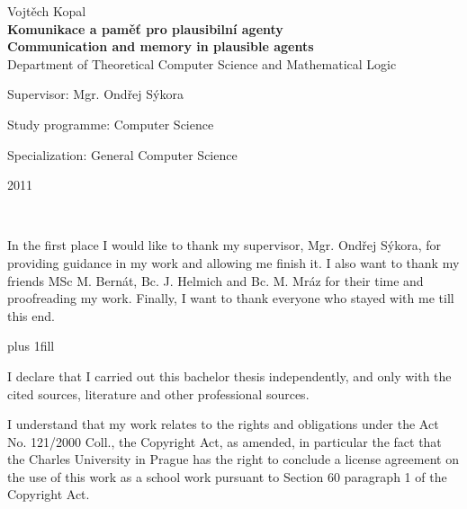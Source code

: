 \documentclass[12pt,a4paper]{report}
\begin{document}
\begin{titlepage}
\begin{center}
\vspace{15mm}

{\Large Vojtěch Kopal}\\ %
\vspace{5mm}
{\Large\bf Komunikace a pamě\v{t} pro plausibilní agenty}\\ %
\vspace{3mm}
{\Large\bf Communication and memory in plausible agents}\\ %
\vspace{5mm}
{\Large Department of Theoretical Computer Science and Mathematical Logic}\\
\end{center}
\vspace{10mm}

\large
\noindent Supervisor: Mgr. Ondřej Sýkora
\vspace{1mm} 

\noindent Study programme: Computer Science

\noindent Specialization: General Computer Science

\vspace{10mm}

\begin{center}
2011
\end{center}

\end{titlepage} %

\normalsize %
\setcounter{page}{2} %
\ \vspace{10mm} 

\noindent In the first place I would like to thank my supervisor, Mgr. Ondřej Sýkora, for providing guidance in my work and allowing me finish it. I also want to thank my friends MSc M. Bernát, Bc. J. Helmich and Bc. M. Mráz for their time and proofreading my work. Finally, I want to thank everyone who stayed with me till this end. %

\newpage

\vglue 0pt plus 1fill

\vspace{\fill} %
\noindent I declare that I carried out this bachelor thesis independently, and only with the cited 
sources, literature and other professional sources. 

\noindent I understand that my work relates to the rights and obligations under the Act No. 
121/2000 Coll., the Copyright Act, as amended, in particular the fact that the Charles 
University in Prague has the right to conclude a license agreement on the use of this 
work as a school work pursuant to Section 60 paragraph 1 of the Copyright Act. 
\end{document}
